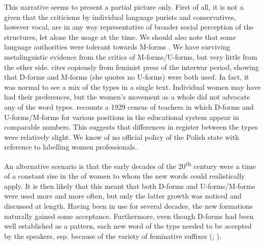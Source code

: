 \documentclass[output=paper,colorlinks,citecolor=brown]{langscibook}
\begin{document}
This narrative seems to present a partial picture only. First of all, it is not a given that the criticisms by individual language purists and conservatives, however vocal, are in any way representative of broader social perception of the structures, let alone the usage at the time. We should also note that some language authorities were tolerant towards M-forms \citep[30--31]{jezykpolski1931-188}. We have surviving metalinguistic evidence from the critics of M-forms/U-forms, but very little from the other side. \citet{wozniak2014} cites copiously from feminist press of the interwar period, showing that D-forms and M-forms (she quotes no U-forms) were both used. In fact, it was normal to see a mix of the types in a single text. Individual women may have had their preferences, but the women's movement as a whole did not advocate any of the word types. \citet[103]{klemensiewicz1957} recounts a 1929 census of teachers in which D-forms and U-forms/M-forms for various positions in the educational system appear in comparable numbers. This suggests that differences in register between the types were relatively slight. We know of no official policy of the Polish state with reference to labelling women professionals.

An alternative scenario is that the early decades of the 20\textsuperscript{th} century were a time of a constant rise in the  of women to whom the new words could realistically apply. It is then likely that this meant that both D-forms and U-forms/M-forms were used more and more often, but only the latter growth was noticed and discussed at length. Having been in use for several decades, the new formations naturally gained some acceptance. Furthermore, even though D-forms had been well established as a pattern, each new word of the type needed to be accepted by the speakers, esp. because of the variety of feminative suffixes (\citealt[298--300]{wozniak2014}; \citealt[1]{obrebska-jablonska1949}).
\end{document}
